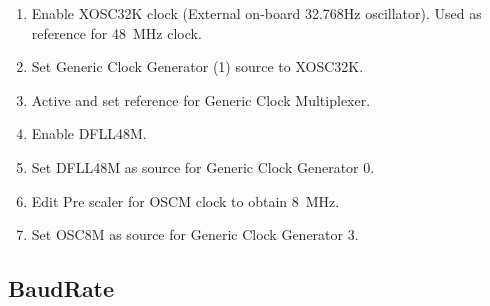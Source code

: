 \begin{enumerate}
	\item Enable XOSC32K clock (External on-board 32.768Hz oscillator). Used as reference for \SI{48}{\mega\hertz} clock.
	\item Set Generic Clock Generator (1) source to XOSC32K.
	\item Active and set reference for Generic Clock Multiplexer.
	\item Enable DFLL48M.
	\item Set DFLL48M as source for Generic Clock Generator 0.
	\item Edit Pre scaler for OSCM clock to obtain \SI{8}{\mega\hertz}.
	\item Set OSC8M as source for Generic Clock Generator 3.
\end{enumerate} 
\subsection{BaudRate}


\FloatBarrier